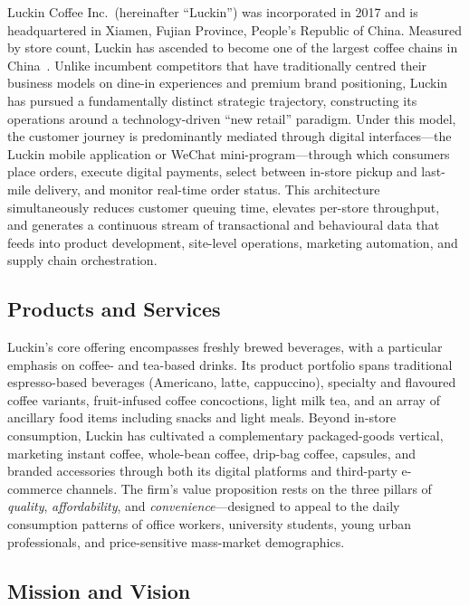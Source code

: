 \documentclass[12pt,a4paper]{article}
\begin{document}
Luckin Coffee Inc.\ (hereinafter ``Luckin'') was incorporated in 2017 and is headquartered in Xiamen, Fujian Province, People's Republic of China. Measured by store count, Luckin has ascended to become one of the largest coffee chains in China~\cite{luckin2025annual}. Unlike incumbent competitors that have traditionally centred their business models on dine-in experiences and premium brand positioning, Luckin has pursued a fundamentally distinct strategic trajectory, constructing its operations around a technology-driven ``new retail'' paradigm. Under this model, the customer journey is predominantly mediated through digital interfaces---the Luckin mobile application or WeChat mini-program---through which consumers place orders, execute digital payments, select between in-store pickup and last-mile delivery, and monitor real-time order status. This architecture simultaneously reduces customer queuing time, elevates per-store throughput, and generates a continuous stream of transactional and behavioural data that feeds into product development, site-level operations, marketing automation, and supply chain orchestration.

\subsection{Products and Services}

Luckin's core offering encompasses freshly brewed beverages, with a particular emphasis on coffee- and tea-based drinks. Its product portfolio spans traditional espresso-based beverages (Americano, latte, cappuccino), specialty and flavoured coffee variants, fruit-infused coffee concoctions, light milk tea, and an array of ancillary food items including snacks and light meals. Beyond in-store consumption, Luckin has cultivated a complementary packaged-goods vertical, marketing instant coffee, whole-bean coffee, drip-bag coffee, capsules, and branded accessories through both its digital platforms and third-party e-commerce channels. The firm's value proposition rests on the three pillars of \emph{quality}, \emph{affordability}, and \emph{convenience}---designed to appeal to the daily consumption patterns of office workers, university students, young urban professionals, and price-sensitive mass-market demographics.

\subsection{Mission and Vision}
\end{document}
